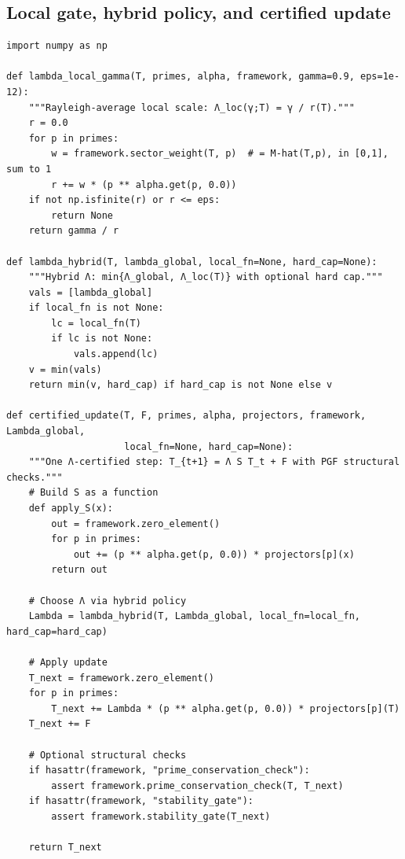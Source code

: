 \documentclass[11pt]{article}
\theoremstyle{definition}
\begin{document}
\subsection{Local gate, hybrid policy, and certified update}
\begin{lstlisting}[style=py,caption={Local Rayleigh gate, hybrid selection, certified update},label={lst:localhyb}]
import numpy as np

def lambda_local_gamma(T, primes, alpha, framework, gamma=0.9, eps=1e-12):
    """Rayleigh-average local scale: Λ_loc(γ;T) = γ / r(T)."""
    r = 0.0
    for p in primes:
        w = framework.sector_weight(T, p)  # = M-hat(T,p), in [0,1], sum to 1
        r += w * (p ** alpha.get(p, 0.0))
    if not np.isfinite(r) or r <= eps:
        return None
    return gamma / r

def lambda_hybrid(T, lambda_global, local_fn=None, hard_cap=None):
    """Hybrid Λ: min{Λ_global, Λ_loc(T)} with optional hard cap."""
    vals = [lambda_global]
    if local_fn is not None:
        lc = local_fn(T)
        if lc is not None:
            vals.append(lc)
    v = min(vals)
    return min(v, hard_cap) if hard_cap is not None else v

def certified_update(T, F, primes, alpha, projectors, framework, Lambda_global,
                     local_fn=None, hard_cap=None):
    """One Λ-certified step: T_{t+1} = Λ S T_t + F with PGF structural checks."""
    # Build S as a function
    def apply_S(x):
        out = framework.zero_element()
        for p in primes:
            out += (p ** alpha.get(p, 0.0)) * projectors[p](x)
        return out

    # Choose Λ via hybrid policy
    Lambda = lambda_hybrid(T, Lambda_global, local_fn=local_fn, hard_cap=hard_cap)

    # Apply update
    T_next = framework.zero_element()
    for p in primes:
        T_next += Lambda * (p ** alpha.get(p, 0.0)) * projectors[p](T)
    T_next += F

    # Optional structural checks
    if hasattr(framework, "prime_conservation_check"):
        assert framework.prime_conservation_check(T, T_next)
    if hasattr(framework, "stability_gate"):
        assert framework.stability_gate(T_next)

    return T_next
\end{lstlisting}
\end{document}
